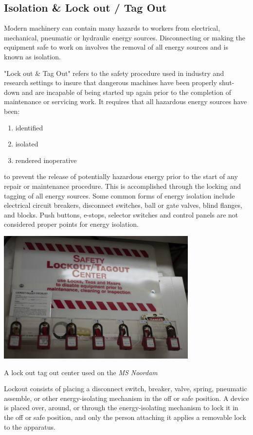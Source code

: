 \documentclass[11pt,a4paper]{article}
\begin{document}
\subsection{Isolation \& Lock out / Tag Out}
Modern machinery can contain many hazards to workers from electrical, mechanical, pneumatic or hydraulic energy sources. Disconnecting or making the equipment safe to work on involves the removal of all energy sources and is known as isolation.

"Lock out \& Tag Out" refers to the safety procedure used in industry and research settings to insure that dangerous machines have been properly shut-down and are incapable of being started up again prior to the completion of maintenance or servicing work. It requires that all hazardous energy sources have been:
\begin{enumerate}
    \item identified
    \item isolated
    \item rendered inoperative
\end{enumerate}
to prevent the release of potentially hazardous energy prior to the start of any repair or maintenance procedure. This is accomplished through the locking and tagging of all energy sources. Some common forms of energy isolation include electrical circuit breakers, disconnect switches, ball or gate valves, blind flanges, and blocks. Push buttons, e-stops, selector switches and control panels are not considered proper points for energy isolation.

\begin{center}
  \includegraphics[width=10cm]{newloto.jpg}\par
  A lock out tag out center used on the \textit{MS Noordam}
  \end{center}

Lockout consists of placing a disconnect switch, breaker, valve, spring, pneumatic assemble, or other energy-isolating mechanism in the off or safe position. A device is placed over, around, or through the energy-isolating mechanism to lock it in the off or safe position, and only the person attaching it applies a removable lock to the apparatus.
\end{document}
